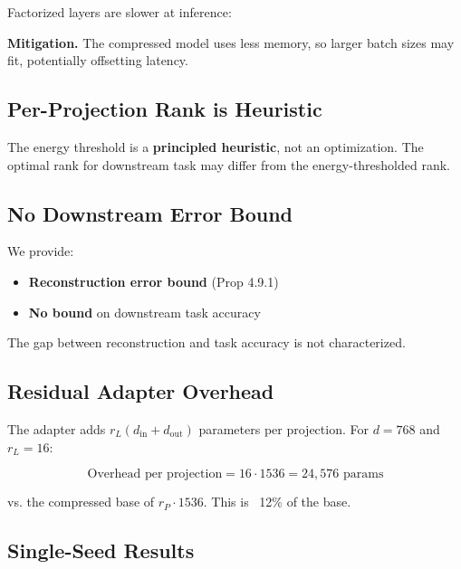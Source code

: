 Factorized layers are slower at inference:
\textbf{Mitigation.} The compressed model uses less memory, so larger batch sizes 
may fit, potentially offsetting latency.

\subsection{Per-Projection Rank is Heuristic}

The energy threshold is a \textbf{principled heuristic}, not an optimization. The 
optimal rank for downstream task may differ from the energy-thresholded rank.

\subsection{No Downstream Error Bound}

We provide:
\begin{itemize}
\item \textbf{Reconstruction error bound} (Prop 4.9.1)
\item \textbf{No bound} on downstream task accuracy

\end{itemize}
The gap between reconstruction and task accuracy is not characterized.

\subsection{Residual Adapter Overhead}

The adapter adds $r_L (d_\text{in} + d_\text{out})$ parameters per projection. 
For $d = 768$ and $r_L = 16$:

\[
\text{Overhead per projection} = 16 \cdot 1536 = 24,576 \text{ params}
\]

vs. the compressed base of $r_P \cdot 1536$. This is ~12\% 
of the base.

\subsection{Single-Seed Results}

